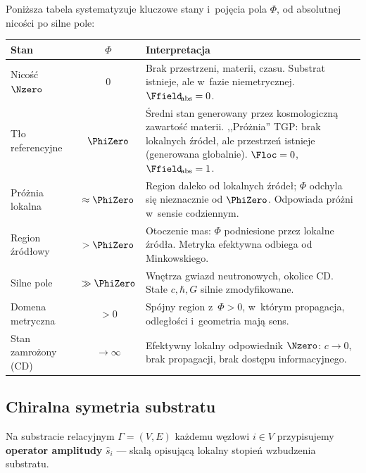 \begin{remark}\label{rem:tablica-stanow}
Poni\.zsza tabela systematyzuje kluczowe stany i~poj\k{e}cia
pola $\Phi$, od absolutnej nico\'sci po silne pole:

\begin{center}
\small
\begin{tabular}{@{}>{\raggedright}p{2.5cm}cp{10cm}@{}}
\toprule
\textbf{Stan} & $\Phi$ & \textbf{Interpretacja} \\
\midrule
Nico\'s\'c $\Nzero$ & $0$
  & Brak przestrzeni, materii, czasu. Substrat istnieje,
    ale w~fazie niemetrycznej. $\Ffield_{\!\mathrm{abs}} = 0$. \\[4pt]
T\l{}o referencyjne & $\PhiZero$
  & \'Sredni stan generowany przez kosmologiczn\k{a} zawarto\'s\'c
    materii. ,,Pr\'o\.znia'' TGP: brak lokalnych \'zr\'ode\l{}, ale
    przestrze\'n istnieje (generowana globalnie).
    $\Floc = 0$, $\Ffield_{\!\mathrm{abs}} = 1$. \\[4pt]
Pr\'o\.znia lokalna & $\approx \PhiZero$
  & Region daleko od lokalnych \'zr\'ode\l{};
    $\Phi$ odchyla si\k{e} nieznacznie od $\PhiZero$.
    Odpowiada pr\'o\.zni w~sensie codziennym. \\[4pt]
Region \'zr\'od\l{}owy & $> \PhiZero$
  & Otoczenie mas: $\Phi$ podniesione przez lokalne \'zr\'od\l{}a.
    Metryka efektywna odbiega od Minkowskiego. \\[4pt]
Silne pole & $\gg \PhiZero$
  & Wn\k{e}trza gwiazd neutronowych, okolice CD.
    Sta\l{}e $c, \hbar, G$ silnie zmodyfikowane. \\[4pt]
Domena metryczna & $> 0$
  & Sp\'ojny region z~$\Phi > 0$, w~kt\'orym propagacja,
    odleg\l{}o\'sci i~geometria maj\k{a} sens. \\[4pt]
Stan zamro\.zony (CD) & $\to\infty$
  & Efektywny lokalny odpowiednik $\Nzero$:
    $c \to 0$, brak propagacji, brak dost\k{e}pu
    informacyjnego. \\
\bottomrule
\end{tabular}
\end{center}
\end{remark}

\subsection{Chiralna symetria substratu}\label{ssec:chiralna}\label{ax:symmetry}

Na substracie relacyjnym $\Gamma = (V, E)$ ka\.zdemu
w\k{e}z\l{}owi $i \in V$ przypisujemy \textbf{operator
amplitudy} $\hat{s}_i$ --- skal\k{a} opisuj\k{a}c\k{a}
lokalny stopie\'n wzbudzenia substratu.

